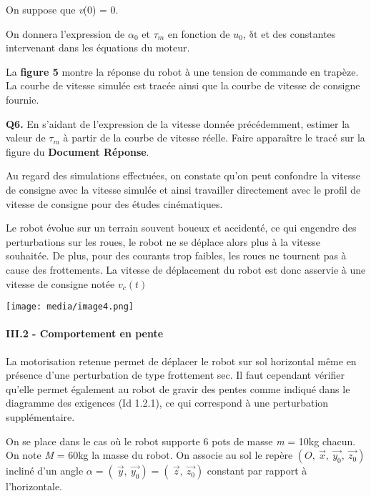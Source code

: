 \documentclass[
]{article}
\begin{document}
On suppose que \emph{v}(0) = 0.

On donnera l'expression de \(\alpha_{0}\) et \(\tau_{m}\) en fonction de
\(u_{0}\), \(\text{δt}\) et des constantes intervenant dans les
équations du moteur.

La \textbf{figure 5} montre la réponse du robot à une tension de
commande en trapèze. La courbe de vitesse simulée est tracée ainsi que
la courbe de vitesse de consigne fournie.

\textbf{Q6.} En s'aidant de l'expression de la vitesse donnée
précédemment, estimer la valeur de \(\tau_{m}\) à partir de la courbe de
vitesse réelle. Faire apparaître le tracé sur la figure du
\textbf{Document Réponse}.

Au regard des simulations effectuées, on constate qu'on peut confondre
la vitesse de consigne avec la vitesse simulée et ainsi travailler
directement avec le profil de vitesse de consigne pour des études
cinématiques.

Le robot évolue sur un terrain souvent boueux et accidenté, ce qui
engendre des perturbations sur les roues, le robot ne se déplace alors
plus à la vitesse souhaitée. De plus, pour des courants trop faibles,
les roues ne tournent pas à cause des frottements. La vitesse de
déplacement du robot est donc asservie à une vitesse de consigne notée
\(v_{c}(t)\)

\texttt{[image: media/image4.png]}

\hypertarget{iii.2---comportement-en-pente}{%
\paragraph{III.2 - Comportement en
pente}\label{iii.2---comportement-en-pente}}

La motorisation retenue permet de déplacer le robot sur sol horizontal
même en présence d'une perturbation de type frottement sec. Il faut
cependant vérifier qu'elle permet également au robot de gravir des
pentes comme indiqué dans le diagramme des exigences (Id 1.2.1), ce qui
correspond à une perturbation supplémentaire.

On se place dans le cas où le robot supporte 6 pots de masse \emph{m} =
10kg chacun. On note \emph{M} = 60kg la masse du robot. On associe au
sol le repère
\((O,\ \overrightarrow{x},\ \overrightarrow{y_{0}},\ \overrightarrow{z_{0}})\)
incliné d'un angle
\(\alpha = \left( \ \overrightarrow{y},\ \overrightarrow{y_{0}} \right) = \left( \ \overrightarrow{z},\ \overrightarrow{z_{0}} \right)\)
constant par rapport à l'horizontale.
\end{document}

